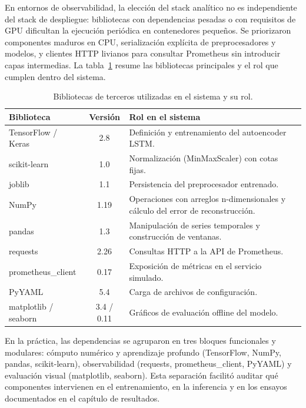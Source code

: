 En entornos de observabilidad, la elección del stack analítico no es independiente del stack de despliegue: bibliotecas con dependencias pesadas o con requisitos de GPU dificultan la ejecución periódica en contenedores pequeños. Se priorizaron componentes maduros en CPU, serialización explícita de preprocesadores y modelos, y clientes HTTP livianos para consultar Prometheus sin introducir capas intermedias. La tabla~\ref{tab:bibliotecas} resume las bibliotecas principales y el rol que cumplen dentro del sistema.

\begin{table}[h]
\centering
\small
\caption{Bibliotecas de terceros utilizadas en el sistema y su rol.}
\label{tab:bibliotecas}
\begin{tabular}{@{}p{}cp{}@{}}
\toprule
\textbf{Biblioteca} & \textbf{Versión} & \textbf{Rol en el sistema} \\
\midrule
TensorFlow / Keras & 2.8 & Definición y entrenamiento del autoencoder LSTM. \\
\addlinespace
scikit-learn & 1.0 & Normalización (MinMaxScaler) con cotas fijas. \\
joblib & 1.1 & Persistencia del preprocesador entrenado. \\
\addlinespace
NumPy & 1.19 & Operaciones con arreglos n-dimensionales y cálculo del error de reconstrucción. \\
pandas & 1.3 & Manipulación de series temporales y construcción de ventanas. \\
\addlinespace
requests & 2.26 & Consultas HTTP a la API de Prometheus. \\
prometheus\_\allowbreak client & 0.17 & Exposición de métricas en el servicio simulado. \\
\addlinespace
PyYAML & 5.4 & Carga de archivos de configuración. \\
\addlinespace
matplotlib / seaborn & 3.4 / 0.11 & Gráficos de evaluación offline del modelo. \\
\bottomrule
\end{tabular}
\end{table}

En la práctica, las dependencias se agruparon en tres bloques funcionales y modulares: cómputo numérico y aprendizaje profundo (TensorFlow, NumPy, pandas, scikit-learn), observabilidad (requests, prometheus\_client, PyYAML) y evaluación visual (matplotlib, seaborn). Esta separación facilitó auditar qué componentes intervienen en el entrenamiento, en la inferencia y en los ensayos documentados en el capítulo de resultados.

